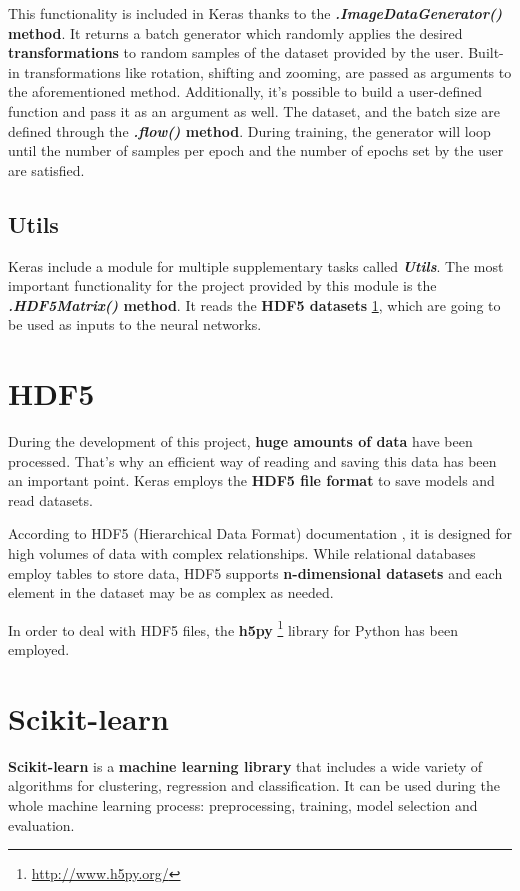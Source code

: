 This functionality is included in Keras thanks to the \textbf{\textit{.ImageDataGenerator()} method}. It returns a batch generator which randomly applies the desired \textbf{transformations} to random samples of the dataset provided by the user. Built-in transformations like rotation, shifting and zooming, are passed as arguments to the aforementioned method. Additionally, it's possible to build a user-defined function and pass it as an argument as well. The dataset, and the batch size are defined through the \textbf{\textit{.flow()} method}. During training, the generator will loop until the number of samples per epoch and the number of epochs set by the user are satisfied.

\subsection{Utils}
Keras include a module for multiple supplementary tasks called \textbf{\textit{Utils}}. The most important functionality for the project provided by this module is the \textbf{\textit{.HDF5Matrix()} method}. It reads the \textbf{HDF5 datasets} \ref{sec:hdf}, which are going to be used as inputs to the neural networks.

\section{HDF5}\label{sec:hdf}
During the development of this project, \textbf{huge amounts of data} have been processed. That's why an efficient way of reading and saving this data has been an important point. Keras employs the \textbf{HDF5 file format} to save models and read datasets.

According to HDF5 (Hierarchical Data Format) documentation \cite{hdf5}, it is designed for high volumes of data with complex relationships. While relational databases employ tables to store data, HDF5 supports \textbf{n-dimensional datasets} and each element in the dataset may be as complex as needed.

In order to deal with HDF5 files, the \textbf{h5py} \footnote{\url{http://www.h5py.org/}} library for Python has been employed.

\section{Scikit-learn}\label{sec:sklearn}
\textbf{Scikit-learn} \cite{scikit-learn} is a \textbf{machine learning library} that includes a wide variety of algorithms for clustering, regression and classification. It can be used during the whole machine learning process: preprocessing, training, model selection and evaluation.

